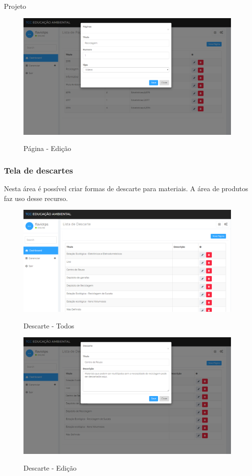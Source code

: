 \documentclass[
	12pt,				%
	openany,			%
	twoside,			%
	a4paper,			%
	english,			%
	french,				%
	spanish,			%
	brazil				%
	]{abntex2}
\begin{document}
\begin{chapter}{Projeto}
\begin{figure}[h]
\centering
   \caption{Página - Edição}
   \includegraphics[scale=0.40]{media/tela_pagina_site_2.png}
     \label{fig:tela_pagina_site_2}
\end{figure}
\newpage
\subsubsection{Tela de descartes} \label{tela_descarte}
Nesta área é possível criar formas de descarte para materiais. A área de produtos faz uso desse recurso.

\begin{figure}[h]
\centering
   \caption{Descarte - Todos}
   \includegraphics[scale=0.40]{media/tela_descarte_site_1.png}
     \label{fig:tela_descarte_site_1}
\end{figure}

\begin{figure}[h]
\centering
   \caption{Descarte - Edição}
   \includegraphics[scale=0.40]{media/tela_descarte_site_2.png}
     \label{fig:tela_descarte_site_2}
\end{figure}
\newpage

\end{chapter}
\end{document}
